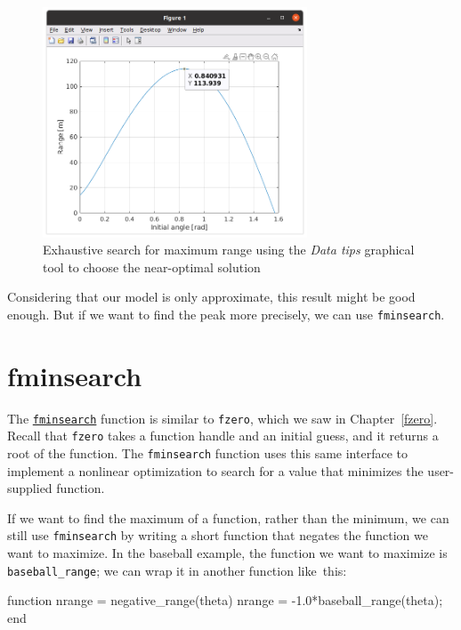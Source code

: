 \begin{figure}[h]
\centerline{\includegraphics[width=0.7\textwidth]{../code/chap13/range_exhaustive.png}}
\caption{Exhaustive search for maximum range using the \emph{Data tips} graphical tool to choose the near-optimal solution}
\label{fig:baseball4}
\end{figure}


Considering that our model is only approximate, this result might be good enough.  But if we want to find the peak more precisely, we can use \lstinline{fminsearch}.


\section{fminsearch}

The \href{https://www.mathworks.com/help/matlab/ref/fminsearch.html}{\lstinline{fminsearch}} function is similar to \lstinline{fzero}, which we saw in Chapter~\ref{fzero}.  Recall that \lstinline{fzero} takes a function handle and an initial guess, and it returns a root of the function.  The \lstinline{fminsearch} function uses this same interface to implement a nonlinear optimization to search for a value that minimizes the user-supplied function.


If we want to find the maximum of a function, rather than the minimum, we can still use \lstinline{fminsearch} by writing a short function that negates the function we want to maximize.
In the baseball example, the function we want to maximize is \lstinline{baseball_range}; we can wrap it in another function like~this:

\begin{code}
function nrange = negative_range(theta)
nrange = -1.0*baseball_range(theta);
end
\end{code}


